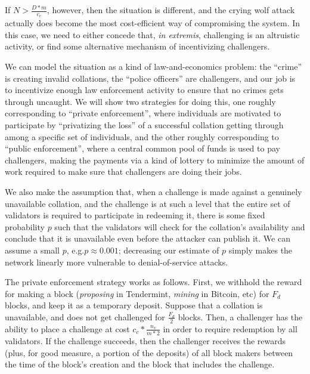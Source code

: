 \documentclass[11pt,a4paper]{article}
\makeatletter
\theoremstyle{plain}
\theoremstyle{definition}
\theoremstyle{remark}
\newcommand{\eg}{e.g.\@\xspace}
\makeatother
\begin{document}
If $N > \frac{D * m}{c_c}$, however, then the situation is different, and the crying wolf attack actually does become the most cost-efficient way of compromising the system. In this case, we need to either concede that, \emph{in extremis}, challenging is an altruistic activity, or find some alternative mechanism of incentivizing challengers.

We can model the situation as a kind of law-and-economics problem: the ``crime'' is creating invalid collations, the ``police officers'' are challengers, and our job is to incentivize enough law enforcement activity to ensure that no crimes gets through uncaught. We will show two strategies for doing this, one roughly corresponding to ``private enforcement'', where individuals are motivated to participate by ``privatizing the loss'' of a successful collation getting through among a specific set of individuals, and the other roughly corresponding to ``public enforcement'', where a central common pool of funds is used to pay challengers, making the payments via a kind of lottery to minimize the amount of work required to make sure that challengers are doing their jobs.

We also make the assumption that, when a challenge is made against a genuinely unavailable collation, and the challenge is at such a level that the entire set of validators is required to participate in redeeming it, there is some fixed probability $p$ such that the validators will check for the collation's availability and conclude that it is unavailable even before the attacker can publish it. We can assume a small $p$, \eg $p \approx 0.001$; decreasing our estimate of $p$ simply makes the network linearly more vulnerable to denial-of-service attacks.

The private enforcement strategy works as follows. First, we withhold the reward for making a block (\emph{proposing} in Tendermint, \emph{mining} in Bitcoin, etc) for $F_d$ blocks, and keep it as a temporary deposit. Suppose that a collation is unavailable, and does not get challenged for $\frac{F_d}{2}$ blocks. Then, a challenger has the ability to place a challenge at cost $c_c * \frac{n_v}{m * 2}$ in order to require redemption by all validators. If the challenge succeeds, then the challenger receives the rewards (plus, for good measure, a portion of the deposits) of all block makers between the time of the block's creation and the block that includes the challenge.
\end{document}
